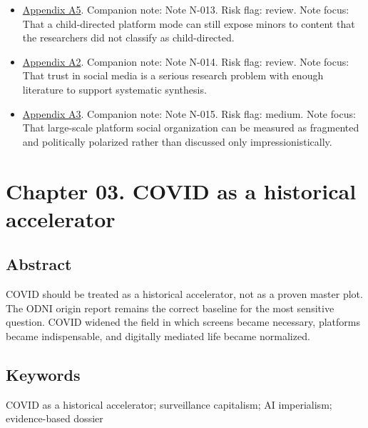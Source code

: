 \documentclass[
  american,
  11pt,
  letterpaper,
]{article}
\begin{document}
\begin{itemize}
  cross-national evidence supports the claim that social media is widely
  associated with manipulation, division, and declining civility, even
  where some respondents still see democratic benefits.
\item
  \hyperref[ch-02-appendix-a5-when-kids-mode-isn-t-for-kids-investigating-tiktok-s-under-13-experience]{Appendix
  A5}. Companion note: Note N-013. Risk flag: review. Note focus: That a
  child-directed platform mode can still expose minors to content that
  the researchers did not classify as child-directed.
\item
  \hyperref[ch-02-appendix-a2-what-do-we-mean-when-we-talk-about-trust-in-social-media-a-systematic-review]{Appendix
  A2}. Companion note: Note N-014. Risk flag: review. Note focus: That
  trust in social media is a serious research problem with enough
  literature to support systematic synthesis.
\item
  \hyperref[ch-02-appendix-a3-quantifying-social-organization-and-political-polarization-in-online-platforms]{Appendix
  A3}. Companion note: Note N-015. Risk flag: medium. Note focus: That
  large-scale platform social organization can be measured as fragmented
  and politically polarized rather than discussed only
  impressionistically.
\end{itemize}

\newpage

\section{Chapter 03. COVID as a historical
accelerator}\label{chapter-03.-covid-as-a-historical-accelerator}

\subsection{Abstract}\label{abstract-3}

COVID should be treated as a historical accelerator, not as a proven
master plot. The ODNI origin report remains the correct baseline for the
most sensitive question. COVID widened the field in which screens became
necessary, platforms became indispensable, and digitally mediated life
became normalized.

\subsection{Keywords}\label{keywords-3}

COVID as a historical accelerator; surveillance capitalism; AI
imperialism; evidence-based dossier
\end{document}
